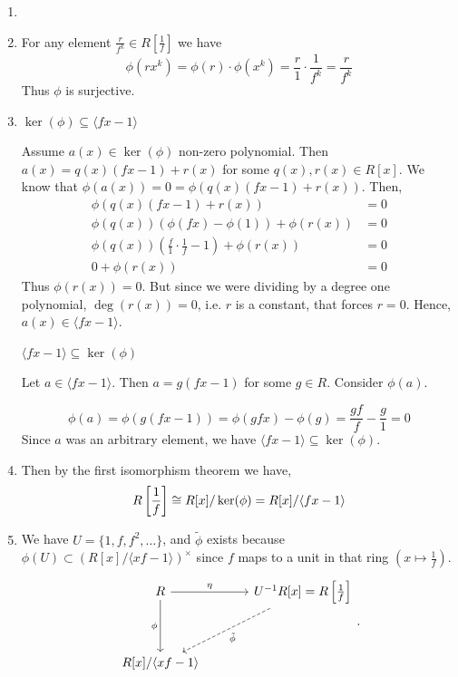 \documentclass[Notebook.tex]{subfiles}
\begin{document}
\begin{solution}
	\bbni 
	\begin{enumerate}
		\item \todo{}
		\item For any element $\frac{r}{f^k} \in R\left [\frac{1}{f} \right ]$ we have 
		\[\phi(rx^k) =\phi(r) \cdot \phi(x^k) = \frac{r}{1} \cdot \frac{1}{f^k} = \frac{r}{f^k}\] 
		Thus $\phi$ is surjective. 

		\item $\ker(\phi) \subseteq \langle fx -1 \rangle$
		
		Assume $a(x) \in \ker(\phi)$ non-zero polynomial. Then $a(x) = q(x)(fx-1) +r(x)$ for some $q(x), r(x) \in R[x]$. We know that $\phi(a(x)) = 0 = \phi(q(x)(fx-1) + r(x))$. Then, 
		\begin{align*}
			\phi(q(x)(fx-1) + r(x)) &= 0 \\
			\phi(q(x)) (\phi(fx)- \phi(1)) + \phi(r(x)) &= 0 \\ 
			\phi(q(x)) \left (\frac{f}{1} \cdot \frac{1}{f}- 1\right ) + \phi(r(x)) &= 0 \\ 
			0 + \phi(r(x)) &= 0 
		\end{align*}
		Thus $\phi(r(x)) = 0$. But since we were dividing by a degree one polynomial, $\deg(r(x)) = 0$, i.e. $r$ is a constant, that forces $r = 0$.  Hence, $a(x) \in \langle fx - 1\rangle$. 

		\bbni 
		
		$\langle fx -1 \rangle \subseteq \ker(\phi)$

		Let $a \in \langle fx -1 \rangle$. Then $a = g(fx-1)$ for some $g \in R$. Consider $\phi(a)$. 

		\[\phi(a) = \phi(g(fx -1)) = \phi(gfx) - \phi(g) = \frac{gf}{f} - \frac{g}{1} = 0\]
		Since $a$ was an arbitrary element, we have $\langle fx -1 \rangle \subseteq \ker(\phi)$.
		
		\item Then by the first isomorphism theorem we have,
		\[R\left[\frac{1}{f}\right] \cong R[x] / \ker(\phi) = R[x] / \langle fx - 1\rangle\]

		\item We have $U = \{1, f, f^2, \ldots\}$, and $\widetilde{\phi}$ exists because $\phi(U) \subset (R[x]/\langle xf -1 \rangle)^\times$ since $f$ maps to a unit in that ring $\left(x \mapsto \frac{1}{f}\right)$. 
		\[
		\begin{tikzcd}[row sep = 3.5em, column sep = 3.5em]
		R \arrow[r, "\eta"] \arrow[d, swap, "\phi"] & U^{-1}R[x] = R\left[\frac{1}{f}\right]  \arrow[dl, dashed, "\tilde{\phi}"] \\
		R[x]/\langle xf -1 \rangle  & 
		\end{tikzcd}.
		\]
		

\end{enumerate}
\end{solution}
\end{document}
